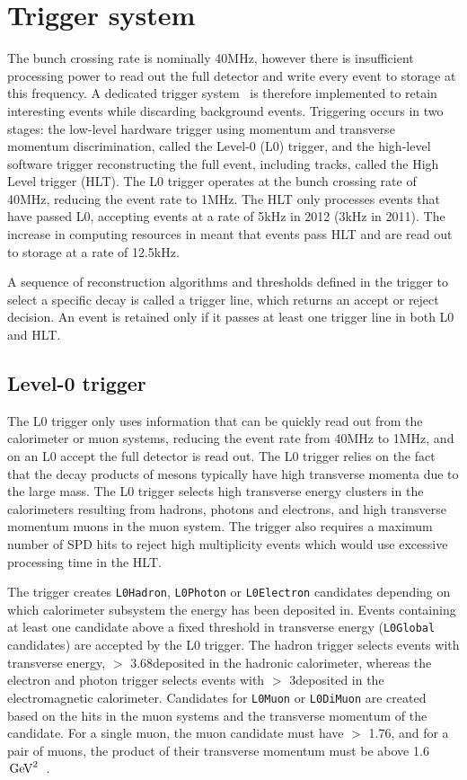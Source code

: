 \section{Trigger system}
\label{sec:detector:trigger}

The \lhc bunch crossing rate is nominally 40MHz, however there is insufficient processing power to read out the full detector and write every event to storage at this frequency. A dedicated trigger system~\cite{LHCb-DP-2012-004} is therefore implemented to retain interesting events while discarding background events. Triggering occurs in two stages: the low-level hardware trigger using momentum and transverse momentum discrimination, called the Level-0 (L0) trigger, and the high-level software trigger reconstructing the full event, including tracks, called the High Level trigger (HLT). The L0 trigger operates at the bunch crossing rate of 40MHz, reducing the event rate to 1MHz. The HLT only processes events that have passed L0, accepting events at a rate of 5kHz in 2012 (3kHz in 2011). The increase in computing resources in \runtwo meant that events pass HLT and are read out to storage at a rate of 12.5kHz.

A sequence of reconstruction algorithms and thresholds defined in the trigger to select a specific decay is called a trigger line, which returns an accept or reject decision. An event is retained only if it passes at least one trigger line in both L0 and HLT.

\subsection{Level-0 trigger}

The L0 trigger only uses information that can be quickly read out from the calorimeter or muon systems, reducing the event rate from 40MHz to 1MHz, and on an L0 accept the full detector is read out. The L0 trigger relies on the fact that the decay products of \B mesons typically have high transverse momenta due to the large \B mass. The L0 trigger selects high transverse energy clusters in the calorimeters resulting from hadrons, photons and electrons, and high transverse momentum muons in the muon system. The trigger also requires a maximum number of SPD hits to reject high multiplicity events which would use excessive processing time in the HLT. 

The trigger creates {\tt L0Hadron}, {\tt L0Photon} or {\tt L0Electron} candidates depending on which calorimeter subsystem the energy has been deposited in. Events containing at least one candidate above a fixed threshold in transverse energy ({\tt L0Global} candidates) are accepted by the L0 trigger. The hadron trigger selects events with transverse energy, \et $>$ 3.68\gev deposited in the hadronic calorimeter, whereas the electron and photon trigger selects events with \et $>$ 3\gev deposited in the electromagnetic calorimeter. Candidates for {\tt L0Muon} or {\tt L0DiMuon} are created based on the hits in the muon systems and the transverse momentum of the candidate. For a single muon, the muon candidate must have \pt $>$ 1.76\gev, and for a pair of muons, the product of their transverse momentum must be above 1.6$\mathrm{\,Ge\kern -0.1em V}^2$~\cite{trigger_tim}.

